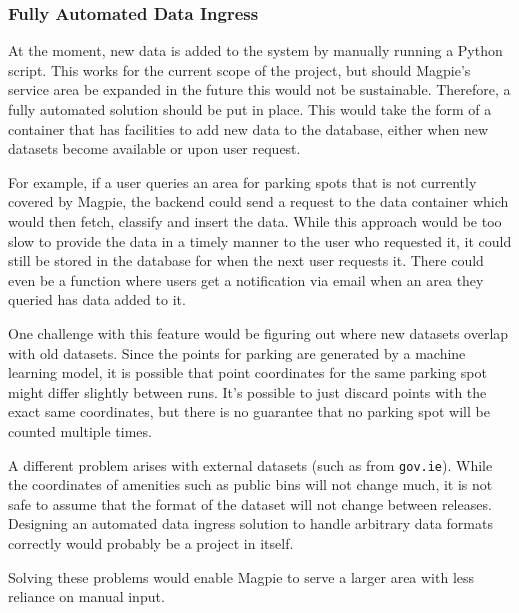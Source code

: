 \subsubsection{Fully Automated Data Ingress}
At the moment, new data is added to the system by manually running a Python
script. This works for the current scope of the project, but should Magpie's
service area be expanded in the future this would not be sustainable. Therefore,
a fully automated solution should be put in place. This would take the form of a
container that has facilities to add new data to the database, either when new
datasets become available or upon user request.

For example, if a user queries an area for parking spots that is not currently
covered by Magpie, the backend could send a request to the data container which
would then fetch, classify and insert the data. While this approach would be too
slow to provide the data in a timely manner to the user who requested it, it
could still be stored in the database for when the next user requests it. There
could even be a function where users get a notification via email when an area
they queried has data added to it.

One challenge with this feature would be figuring out where new datasets overlap
with old datasets. Since the points for parking are generated by a machine
learning model, it is possible that point coordinates for the same parking spot
might differ slightly between runs. It's possible to just discard points with
the exact same coordinates, but there is no guarantee that no parking spot will
be counted multiple times.

A different problem arises with external datasets (such as from
\texttt{gov.ie}). While the coordinates of amenities such as public bins will
not change much, it is not safe to assume that the format of the dataset will
not change between releases. Designing an automated data ingress solution to
handle arbitrary data formats correctly would probably be a project in itself.

Solving these problems would enable Magpie to serve a larger area with less
reliance on manual input.